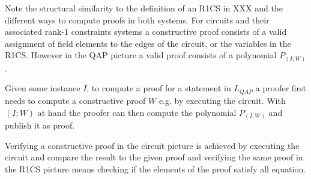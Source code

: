 Note the structural similarity to the definition of an R1CS in XXX and the different ways to compute proofs in both systems. For circuits and their associated rank-1 constraints systems a constructive proof consists of a valid assignment of field elements to the edges of the circuit, or the variables in the R1CS. However in the QAP picture a valid proof consists of a polynomial $P_{(I;W)}$.

Given some instance $I$, to compute a proof for a statement in $L_{QAP}$ a proofer first needs to compute a constructive proof $W$ e.g. by executing the circuit. With $(I;W)$ at hand the proofer can then compute the polynomial $P_{(I;W)}$ and publish it as proof.

Verifying a constructive proof in the circuit picture is achieved by executing the circuit and compare the result to the given proof and verifying the same proof in the R1CS picture means checking if the elements of the proof satisfy all equation. 

